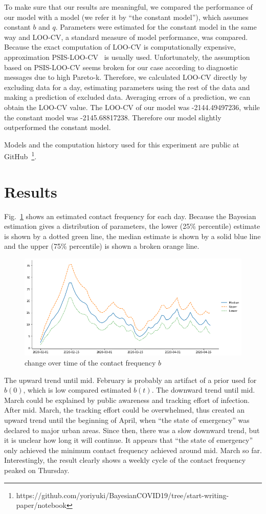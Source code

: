 \documentclass{article}
\begin{document}
To make sure that our results are meaningful, we compared the performance of our model with a model (we refer it by ``the constant model''), which assumes constant $b$ and $q$.
Parameters were estimated for the constant model in the same way and LOO-CV, a standard measure of model performance, was compared.
Because the exact computation of LOO-CV is computationally expensive, approximation PSIS-LOO-CV~\cite{Vehtari2017} is usually used.
Unfortunately, the assumption based on PSIS-LOO-CV seems broken for our case according to diagnostic messages due to high Pareto-k.
Therefore, we calculated LOO-CV directly by excluding data for a day, estimating parameters using the rest of the data and making a prediction of excluded data.
Averaging errors of a prediction, we can obtain the LOO-CV value.
The LOO-CV of our model was -2144.49497236, while the constant model was -2145.68817238. Therefore our model slightly outperformed the constant model.

Models and the computation history used for this experiment are public at GitHub~\footnote{https://github.com/yoriyuki/BayesianCOVID19/tree/start-writing-paper/notebook}.

\section{Results}

Fig.~\ref{fig:b} shows an estimated contact frequency for each day.
Because the Bayesian estimation gives a distribution of parameters, the lower (25\% percentile) estimate is shown by a dotted green line, the median estimate is shown by a solid blue line and the upper (75\% percentile) is shown a broken orange line.
\begin{figure}[h]
 \centering
 \includegraphics[width=\linewidth]{fig/b-Japan.png}
 \caption{ change over time of the contact frequency $b$}
 \label{fig:b}
\end{figure}
The upward trend until mid. February is probably an artifact of a prior used for $b(0)$, which is low compared estimated $b(t)$.
The downward trend until mid. March could be explained by public awareness and tracking effort of infection.
After mid. March, the tracking effort could be overwhelmed, thus created an upward trend until the beginning of April, when ``the state of emergency'' was declared to major urban areas.
Since then, there was a slow downward trend, but it is unclear how long it will continue.
It appears that ``the state of emergency'' only achieved the minimum contact frequency achieved around mid. March so far.
Interestingly, the result clearly shows a weekly cycle of the contact frequency peaked on Thursday.
\end{document}
